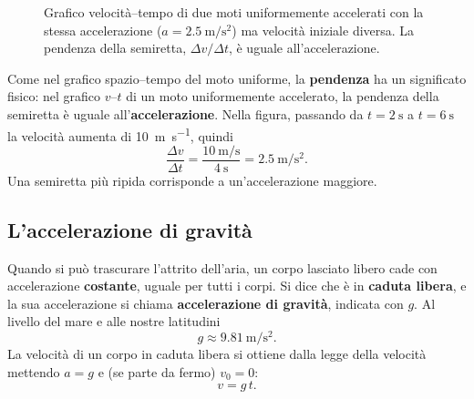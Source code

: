\begin{figure}[!htbp]
    \centering
    \caption{Grafico velocità--tempo di due moti uniformemente accelerati con la stessa accelerazione ($a = \SI{2,5}{\metre\per\second\squared}$) ma velocità iniziale diversa. La pendenza della semiretta, $\Delta v / \Delta t$, è uguale all'accelerazione.}
    \label{fig:vt-mrua}
\end{figure}

Come nel grafico spazio--tempo del moto uniforme, la \textbf{pendenza} ha un significato fisico: nel grafico $v$--$t$ di un moto uniformemente accelerato, la pendenza della semiretta è uguale all'\textbf{accelerazione}. Nella figura, passando da $t = \SI{2}{\second}$ a $t = \SI{6}{\second}$ la velocità aumenta di \SI{10}{\metre\per\second}, quindi
\[ \frac{\Delta v}{\Delta t} = \frac{\SI{10}{\metre\per\second}}{\SI{4}{\second}} = \SI{2,5}{\metre\per\second\squared}. \]
Una semiretta più ripida corrisponde a un'accelerazione maggiore.

\subsection{L'accelerazione di gravità}
Quando si può trascurare l'attrito dell'aria, un corpo lasciato libero cade con accelerazione \textbf{costante}, uguale per tutti i corpi. Si dice che è in \textbf{caduta libera}, e la sua accelerazione si chiama \textbf{accelerazione di gravità}, indicata con $g$. Al livello del mare e alle nostre latitudini
\[ g \approx \SI{9,81}{\metre\per\second\squared}. \]
La velocità di un corpo in caduta libera si ottiene dalla legge della velocità mettendo $a = g$ e (se parte da fermo) $v_0 = 0$:
\[ v = g\,t. \]

